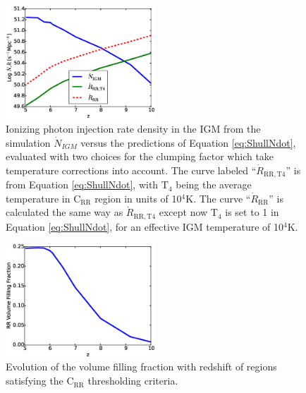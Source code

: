 
\begin{figure}
	\includegraphics[width=0.5\textwidth]{Shull_thresholded.eps}
	\caption{Ionizing photon injection rate density in the IGM from the simulation $\dot{N}_{IGM}$ versus the predictions of Equation \eqref{eq:ShullNdot}, evaluated with two choices for the clumping factor which take temperature corrections into account.   The curve labeled ``$\dot{R}_\mathrm{RR,T4}$'' is from Equation \eqref{eq:ShullNdot}, with T$_4$ being the average temperature in C$_\mathrm{RR}$ region in units of 10$^4$K.  The curve ``$\dot{R}_\mathrm{RR}$'' is calculated the same way as $\dot{R}_\mathrm{RR,T4}$ except now T$_4$ is set to 1 in Equation \eqref{eq:ShullNdot}, for an effective IGM temperature of 10$^4$K.}
	\label{Shull}
\end{figure}

\begin{figure}
	\includegraphics[width=0.5\textwidth]{volumefracCRR.eps}
	\caption{Evolution of the volume filling fraction with redshift of regions satisfying the C$_\mathrm{RR}$ thresholding criteria.}
	\label{volumefracCRR}
\end{figure}

